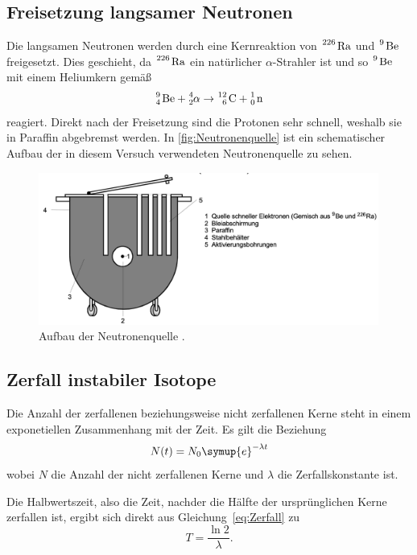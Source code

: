 \subsection{Freisetzung langsamer Neutronen}
\label{sec:Neutronenaktivierung}
Die langsamen Neutronen werden durch eine Kernreaktion von $\ce{^226 Ra}$ und $\ce{^9 Be}$ freigesetzt. Dies geschieht, da
$\ce{^226 Ra}$ ein natürlicher $\alpha$-Strahler ist und so $\ce{^9 Be}$ mit einem Heliumkern gemäß
\begin{equation*}
    \ce{^9_4 Be} + \ce{^4_2 } \alpha \to \ce{^12_6 C} + \ce{^1_0 n}
\end{equation*}
reagiert.
Direkt nach der Freisetzung sind die Protonen sehr schnell, weshalb sie in Paraffin abgebremst werden. In \autoref{fig:Neutronenquelle}
ist ein schematischer Aufbau der in diesem Versuch verwendeten Neutronenquelle zu sehen.
\begin{figure}[H]
    \centering
    \includegraphics[height=5cm]{content/pics/Neutronenquelle.png}
    \caption{Aufbau der Neutronenquelle \cite{v702}.}
    \label{fig:Neutronenquelle}
\end{figure}

\subsection{Zerfall instabiler Isotope}
Die Anzahl der zerfallenen beziehungsweise nicht zerfallenen Kerne steht in einem exponetiellen Zusammenhang mit der Zeit.
Es gilt die Beziehung
\begin{equation}
    N(t)=N_0\symup{e}^{-\lambda t} \label{eq:Zerfall}
\end{equation}
wobei $N$ die Anzahl der nicht zerfallenen Kerne und $\lambda$ die Zerfallskonstante ist.

Die Halbwertszeit, also die Zeit, nachder die Hälfte der ursprünglichen Kerne zerfallen ist, ergibt sich direkt aus
Gleichung~\eqref{eq:Zerfall} zu
\begin{equation}
    T = \frac{\ln 2}{\lambda}. \label{eq:Halbwertszeit}
\end{equation}
